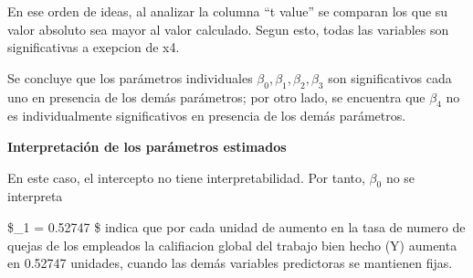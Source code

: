 \documentclass[
]{article}
\begin{document}
En ese orden de ideas, al analizar la columna ``t value'' se comparan
los que su valor absoluto sea mayor al valor calculado. Segun esto,
todas las variables son significativas a exepcion de x4.

Se concluye que los parámetros individuales
\(\beta_0,\beta_1,\beta_2,\beta_3\) son significativos cada uno en
presencia de los demás parámetros; por otro lado, se encuentra que
\(\beta_4\) no es individualmente significativos en presencia de los
demás parámetros.

\textbf{Interpretación de los parámetros estimados}

En este caso, el intercepto no tiene interpretabilidad. Por tanto,
\(\beta_0\) no se interpreta

\$\widehat\beta\_1 = 0.52747 \$ indica que por cada unidad de aumento en
la tasa de numero de quejas de los empleados la califiacion global del
trabajo bien hecho (Y) aumenta en 0.52747 unidades, cuando las demás
variables predictoras se mantienen fijas.
\end{document}
